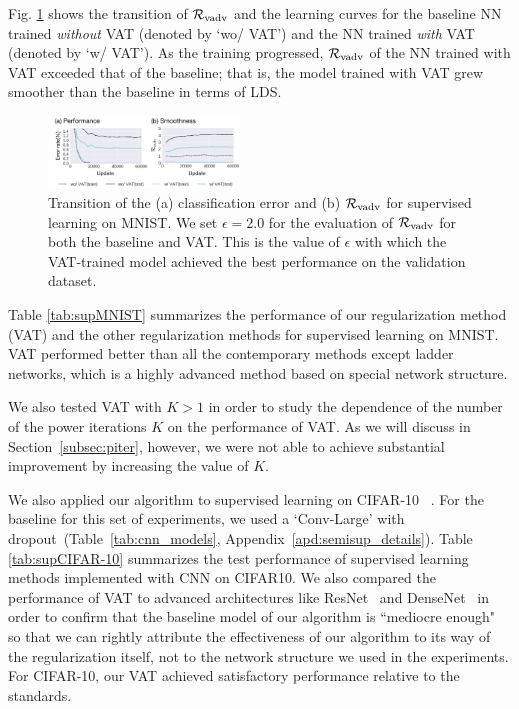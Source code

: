 \documentclass[10pt,journal,compsoc]{IEEEtran}
\newcommand\iwrite[1]{\textcolor{red}{Meada: #1}}
\begin{document}
Fig. \ref{fig:mnist_lc} shows the transition of $\mathcal{R}_{\rm vadv}$ and the learning curves for the baseline NN trained \textit{without} VAT (denoted by `wo/ VAT') and the NN trained \textit{with} VAT (denoted by `w/ VAT'). 
As the training progressed, $\mathcal{R}_{\rm vadv}$ of the NN trained with VAT exceeded that of the baseline; that is, 
the model trained with VAT grew smoother than the baseline in terms of LDS.  
\begin{figure}[ht]
	\centering
	\includegraphics[width=0.45\textwidth]{mnist/test_learning_curves.pdf}
	\caption{\label{fig:mnist_lc}Transition of the (a) classification error and (b) $\mathcal{R}_{\rm vadv}$ for supervised learning on MNIST. 
    We set $\epsilon=2.0$ for the evaluation of $\mathcal{R}_{\rm vadv}$ for both the baseline and VAT.
    This is the value of $\epsilon$ with which the VAT-trained model achieved the best performance on the validation dataset.}
\end{figure}

Table \ref{tab:supMNIST} summarizes the performance of our regularization method (VAT) and the other regularization methods for supervised learning on MNIST. VAT performed better than all the contemporary methods except ladder networks, which is a highly advanced method based on special network structure. 

We also tested VAT with $K >1$ in order to study the dependence of the number of the power iterations $K$ on the performance of VAT. 
As we will discuss in Section~\ref{subsec:piter}, however, we were not able to achieve substantial improvement by increasing the value of $K$. 

We also applied our algorithm to supervised learning on CIFAR-10 ~\cite{krizhevsky2009learning}. 
For the baseline for this set of experiments, we used a `Conv-Large' with dropout~(Table~\ref{tab:cnn_models}, Appendix~\ref{apd:semisup_details}).
Table \ref{tab:supCIFAR-10} summarizes the test performance of supervised learning methods implemented with CNN on CIFAR10. We also compared the performance of VAT to advanced architectures like ResNet~\cite{he2016identity} and DenseNet~\cite{huang2016densely} in order to confirm that the baseline model of our algorithm is ``mediocre enough" so that we can rightly attribute the effectiveness of our algorithm to its way of the  regularization itself, not to the network structure we used in the experiments.
For CIFAR-10, our VAT achieved satisfactory performance relative to the standards.  
\end{document}
